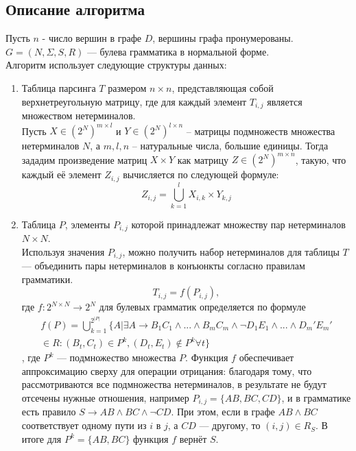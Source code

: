 \subsection {Описание алгоритма}
Пусть $n$ - число вершин в графе $D$, вершины графа пронумерованы. $G = (N, \Sigma, S, R)$ --- булева грамматика в нормальной форме.
\\Алгоритм использует следующие структуры данных:
\begin{enumerate}
\item Таблица парсинга $T$ размером $n \times n$, представляющая собой верхнетреугольную матрицу, где для каждый элемент $T_{i, j}$ является множеством нетерминалов.
\\Пусть $X \in {(2^N)}^{m \times l}$ и $Y \in {(2^N)}^{l \times n}$ – матрицы подмножеств множества нетерминалов $N$, а $m, l, n$ – натуральные числа, большие единицы. Тогда зададим произведение матриц $X \times Y$ как матрицу $Z \in {(2^N)}^{m \times n}$, такую, что каждый её элемент $Z_{i, j}$ вычисляется по следующей формуле:
\begin{equation}\label{eq:mult}
Z_{i,j} = \bigcup_{k=1}^{l}X_{i,k} \times Y_{k, j}
\end{equation}
\item Таблица $P$, элементы $P_{i,j}$ которой принадлежат множеству пар нетерминалов $N \times N$.
\\Используя значения $P_{i,j}$, можно получить набор нетерминалов для таблицы $T$ --- объединить пары нетерминалов в конъюнкты согласно правилам грамматики.
\begin{equation}
T_{i,j} = f(P_{i,j}),
\end{equation}
где $f: 2^{N \times N} \to 2^N$ для булевых грамматик определяется по формуле
  \begin{equation*}
  \begin{aligned}
f(P) = \bigcup_{k=1}^{2^{|P|}} \{A| \exists A \to B_1C_1 \wedge ... \wedge B_mC_m \wedge \neg D_1E_1 \wedge ... \wedge D_m'E_m' \\
\in R: (B_t, C_t) \in P^k, (D_t, E_t) \not\in P^k \forall t\}
\end{aligned}
\end{equation*},
где $P^k$ --- подмножество множества $P$. Функция $f$ обеспечивает аппроксимацию сверху для операции отрицания: благодаря тому, что рассмотриваются все подмножества нетерминалов, в результате не будут отсечены нужные отношения, например $P_{i,j} = \{AB, BC, CD\}$, и в грамматике есть правило $S \to AB \wedge BC \wedge \neg CD$. При этом, если в графе $AB \wedge BC$ соответствует одному пути из $i$ в $j$, а $CD$ --- другому, то $(i,j) \in R_S$. В итоге для $P^k = \{AB, BC\}$ функция $f$ вернёт $S$.
\end{enumerate}

